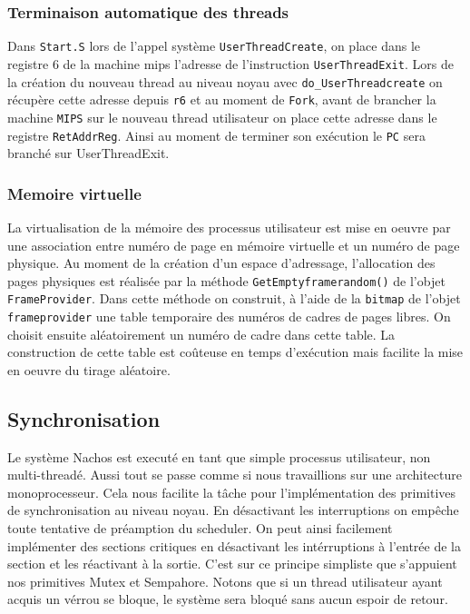 \documentclass[11pt]{article}
\begin{document}
\subsubsection{Terminaison automatique des threads}
Dans \texttt{Start.S} lors de l'appel système \texttt{UserThreadCreate}, on place dans le registre 6 de la machine mips l'adresse de l'instruction \texttt{UserThreadExit}.
Lors de la création du nouveau thread au niveau noyau avec \texttt{do\_UserThreadcreate} on récupère
cette adresse depuis \texttt{r6} et au moment de \texttt{Fork}, avant de brancher la machine \texttt{MIPS} sur
le nouveau thread utilisateur on place cette adresse dans le registre \texttt{RetAddrReg}. Ainsi au moment de terminer son exécution le \texttt{PC} sera branché sur UserThreadExit.

\subsubsection{Memoire virtuelle}
La virtualisation de la mémoire des processus utilisateur est mise en oeuvre par une association entre numéro
de page en mémoire virtuelle et un numéro de page physique. Au moment de la création d'un espace d'adressage, l'allocation des pages physiques est réalisée par la méthode \texttt{GetEmptyframerandom()} de l'objet \texttt{FrameProvider}.
Dans cette méthode on construit, à l'aide de la \texttt{bitmap} de l'objet \texttt{frameprovider} une table temporaire des numéros de cadres de pages libres.
On choisit ensuite aléatoirement un numéro de cadre dans cette table. La construction de cette table est coûteuse en temps d'exécution mais facilite la mise en oeuvre du tirage aléatoire.

\subsection{Synchronisation}
Le système Nachos est executé en tant que simple processus utilisateur, non multi-threadé. Aussi tout se passe comme si nous travaillions sur une architecture monoprocesseur. Cela nous facilite la tâche pour l'implémentation des primitives de synchronisation au niveau noyau. En désactivant les interruptions
on empêche toute tentative de préamption du scheduler. On peut ainsi facilement
implémenter des sections critiques en désactivant les intérruptions à l'entrée de la
section et les réactivant à la sortie. C'est sur ce principe simpliste que s'appuient nos primitives Mutex et Sempahore. Notons que si un thread utilisateur
ayant acquis un vérrou se bloque, le système sera bloqué sans aucun espoir de retour.
\end{document}
